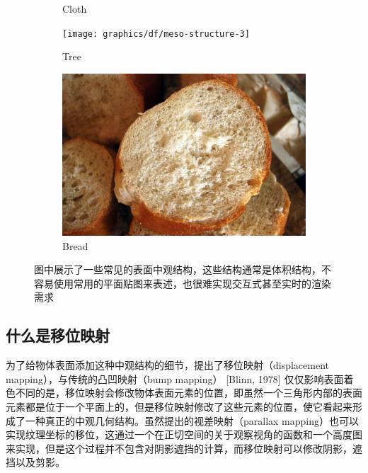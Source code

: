 \begin{figure}
\begin{fullwidth}
\begin{subfigure}[t]{.285\thewidth}
		\caption{Cloth}
	\end{subfigure}
	\begin{subfigure}[t]{.23\thewidth}
		\texttt{[image: graphics/df/meso-structure-3]}
		\caption{Tree}
	\end{subfigure}
	\begin{subfigure}[t]{.26\thewidth}
		\includegraphics[width=\textwidth]{graphics/df/meso-structure-4}
		\caption{Bread}
	\end{subfigure}
	\caption{图中展示了一些常见的表面中观结构，这些结构通常是体积结构，不容易使用常用的平面贴图来表述，也很难实现交互式甚至实时的渲染需求}
	\label{f:df-meso-structure}
\end{fullwidth}
\end{figure}



\subsection{什么是移位映射}
为了给物体表面添加这种中观结构的细节，\cite{a:Shade-Trees}提出了移位映射（displacement mapping），与传统的凸凹映射（bump mapping）\cite{a:SimulationofWrinkledSurfaces} [Blinn, 1978] 仅仅影响表面着色不同的是，移位映射会修改物体表面元素的位置，即虽然一个三角形内部的表面元素都是位于一个平面上的，但是移位映射修改了这些元素的位置，使它看起来形成了一种真正的中观几何结构。虽然\cite{a:DetailedShapeRepresentationwithParallaxMapping}提出的视差映射（parallax mapping）也可以实现纹理坐标的移位，这通过一个在正切空间的关于观察视角的函数和一个高度图来实现，但是这个过程并不包含对阴影遮挡的计算，而移位映射可以修改阴影，遮挡以及剪影。 

